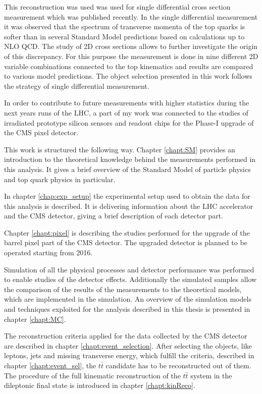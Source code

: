 This reconstruction was used was used for single differential cross section measurement \cite{Khachatryan:2015oqac} which was 
published recently. In the single differential measurement it was observed that the spectrum of transverse momenta of the 
top quarks is softer than in several Standard Model predictions based on calculations up to NLO QCD. The study of 2D cross 
sections allows to further investigate the origin of this discrepancy. For this purpose the measurement is done in nine 
different 2D variable combinations connected to the top kinematics and results are compared to various model predictions.
The object selection presented in this work follows the strategy of single differential measurement.

In order to contribute to future measurements with higher statistics during
the next years runs of the LHC, a part of my work was connected to the studies of irradiated
prototype silicon sensors and readout chips for the Phase-I upgrade of the CMS pixel detector.

This work is structured the following way. Chapter \ref{chapt:SM} provides an introduction to the theoretical
knowledge behind the measurements performed in this analysis. It gives a brief overview of the Standard
Model of particle physics and top quark physics in particular.

In chapter \ref{chap:exp_setup} the experimental setup used to obtain the data for this analysis is described.
It is delivering information about the LHC accelerator and the CMS detector, giving a brief description of each detector part.

Chapter \ref{chapt:pixel} is describing the studies performed for the
upgrade of the barrel pixel part of the CMS detector. The upgraded detector is planned to be operated starting from 2016.

Simulation of all the physical processes and detector performance was performed to enable studies of the detector effects.
Additionally the simulated samples allow the comparison of the results of the measurements to the theoretical models, 
which are implemented in the simulation. An overview of the simulation
models and techniques exploited for the analysis described in this thesis is presented in chapter \ref{chapt:MC}.

The reconstruction criteria applied for the data collected by the CMS detector are described
in chapter \ref{chapt:event_selection}. After selecting the objects, like leptons, jets and missing transverse energy, which 
fulfill the criteria, described in chapter \ref{chapt:event_sel}, the $t\bar{t}$ candidate has to be reconstructed out
of them. The procedure of the full kinematic reconstruction of the $t\bar{t}$ system in the dileptonic final state is introduced
in chapter \ref{chapt:kinReco}.


